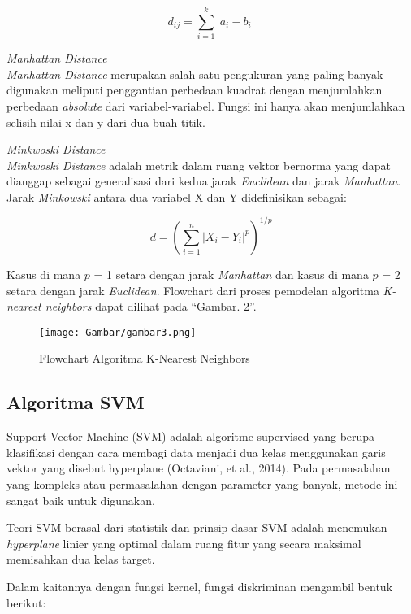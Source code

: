\documentclass[conference]{IEEEtran}
\begin{document}
\begin{equation*}
d_{ij}=\sum^{k}_{i=1} | a_i-b_i |
\label{eq2}
\end{equation*}

\noindent\emph{Manhattan Distance}\\
\emph{Manhattan Distance} merupakan salah satu pengukuran yang paling banyak digunakan meliputi penggantian perbedaan kuadrat dengan menjumlahkan perbedaan \emph{absolute} dari variabel-variabel. Fungsi ini hanya akan menjumlahkan selisih nilai x dan y dari dua buah titik.
\vspace{10pt}

\noindent\emph{Minkwoski Distance}\\
\emph{Minkwoski Distance} adalah metrik dalam ruang vektor bernorma yang dapat dianggap sebagai generalisasi dari kedua jarak \emph{Euclidean} dan jarak \emph{Manhattan}. Jarak \emph{Minkowski} antara dua variabel X dan Y didefinisikan sebagai:

\begin{equation*}
d = (\sum^{n}_{i=1} | X_i-Y_i |^p)^{1/p}
\label{eq3}
\end{equation*}

Kasus di mana $p$ = 1 setara dengan jarak \emph{Manhattan} dan kasus di mana $p$ = 2 setara dengan jarak \emph{Euclidean}.
Flowchart dari proses pemodelan algoritma \emph{K-nearest neighbors} dapat dilihat pada ``Gambar. 2''.\vspace{6pt}
\begin{figure}
\centering
\texttt{[image: Gambar/gambar3.png]}
\caption{Flowchart Algoritma K-Nearest Neighbors}
\end{figure}


\subsection{Algoritma SVM}
Support Vector Machine (SVM) adalah algoritme supervised yang berupa klasifikasi dengan cara membagi data menjadi dua kelas menggunakan garis vektor yang disebut hyperplane (Octaviani, et al., 2014). Pada permasalahan yang kompleks atau permasalahan dengan parameter yang banyak, metode ini sangat baik untuk digunakan.

Teori SVM berasal dari statistik dan prinsip dasar SVM adalah menemukan \emph{hyperplane} linier yang optimal dalam ruang fitur yang secara maksimal memisahkan dua kelas target.

Dalam kaitannya dengan fungsi kernel, fungsi diskriminan mengambil bentuk berikut:
\end{document}
